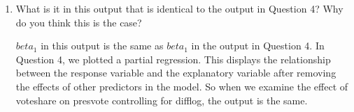 \documentclass[12pt,letterpaper]{article}
\begin{document}
\begin{enumerate}
			\vspace{5cm}
		\item What is it in this output that is identical to the output in Question 4? Why do you think this is the case?
		\vspace{1cm}
		
		$beta_1$ in this output is the same as $beta_1$ in the output in Question 4. In Question 4, we plotted a partial regression. This displays the relationship between the response variable and the explanatory variable after removing the effects of other predictors in the model. So when we examine the effect of voteshare on presvote controlling for difflog, the output is the same. 
		
	\end{enumerate}
\end{document}
